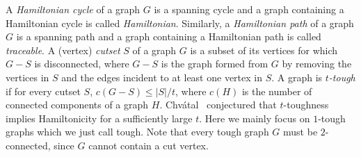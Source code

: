 \documentclass[12pt]{article}
\theoremstyle{definition}
\begin{document}
A {\em Hamiltonian cycle} of a graph $G$ is a spanning cycle and a graph containing a Hamiltonian cycle is called {\em Hamiltonian}. Similarly, a {\em Hamiltonian path} of a graph $G$ is a spanning path and a graph containing a Hamiltonian path is called {\em traceable}.
A (vertex) {\em  cutset} $S$ of a graph $G$ is a subset of its vertices for which $G-S$ is disconnected, where $G-S$ is the graph formed from $G$ by removing the vertices in $S$ and the edges incident to at least one vertex in $S$.
A graph is {\em $t$-tough} if for every cutset $S$, $c(G-S)\leq |S|/t$, where $c(H)$ is the number of connected components of a graph $H$. 
Chv\'atal~\cite{Ch73} conjectured that $t$-toughness implies Hamiltonicity for a sufficiently large $t$. 
Here we mainly focus on $1$-tough graphs which we just call tough. Note that every tough graph $G$ must be $2$-connected, since $G$ cannot contain a cut vertex.
\end{document}
